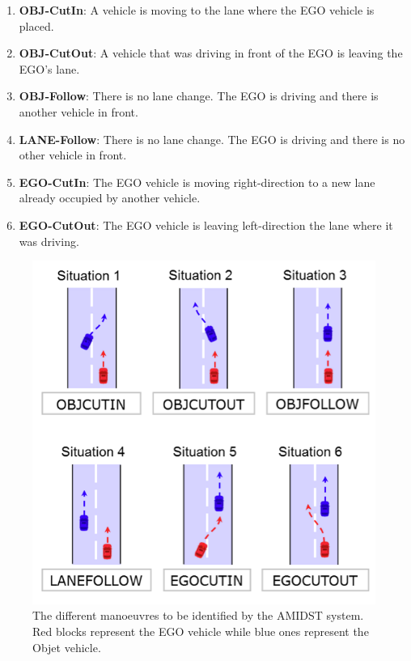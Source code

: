 \begin{enumerate}
\item \textbf{OBJ-CutIn}: A vehicle is moving to the lane where the EGO vehicle is placed.
\item \textbf{OBJ-CutOut}:  A vehicle that was driving in front of the EGO is leaving the EGO's lane.
\item \textbf{OBJ-Follow}: There is no lane change. The EGO is driving and there is another vehicle in front.
\item \textbf{LANE-Follow}: There is no lane change. The EGO is driving and there is no other vehicle in front.
\item \textbf{EGO-CutIn}: The EGO vehicle is moving right-direction to a new lane already occupied by another vehicle. 
\item \textbf{EGO-CutOut}: The EGO vehicle is leaving left-direction the lane where it was driving.
\end{enumerate}

\begin{figure}
\begin{center}
\includegraphics[scale=0.4]{./figures/DaimlerManeuvers}
\caption{\label{Figure:DaimlerManeuvers}The different manoeuvres to be identified by the AMIDST system. Red blocks represent the EGO vehicle while blue ones represent the Objet vehicle.}
\end{center}
\end{figure}

